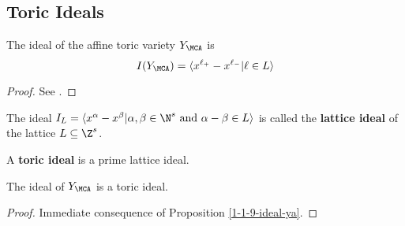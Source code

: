 \subsection{Toric Ideals}


\begin{proposition}
  \label{1-1-9-ideal-ya}

  The ideal of the affine toric variety $Y_\MCA$ is
  \[
    I(Y_\MCA) = \langle x^{\ell_+} - x^{\ell_-} | \ell \in L\rangle
  \]
\end{proposition}
\begin{proof}
  \uses{}

  See \cite{Cox_2011}.
\end{proof}


\begin{definition}
  \label{1-1-10-lat-ideal}
  \uses{}
  \leanok

  The ideal $I_L = \langle x^\alpha - x^\beta | \alpha, \beta \in \N^s \text{ and } \alpha - \beta \in L\rangle$ is called the {\bf lattice ideal} of the lattice $L \subseteq \Z^s$.
\end{definition}


\begin{definition}
  \label{1-1-10-toric-ideal}
  \leanok
  A {\bf toric ideal} is a prime lattice ideal.
\end{definition}


\begin{proposition}
  \label{1-1-10-toric-ideal}

  The ideal of $Y_\MCA$ is a toric ideal.
\end{proposition}
\begin{proof}

  Immediate consequence of Proposition \ref{1-1-9-ideal-ya}.
\end{proof}


